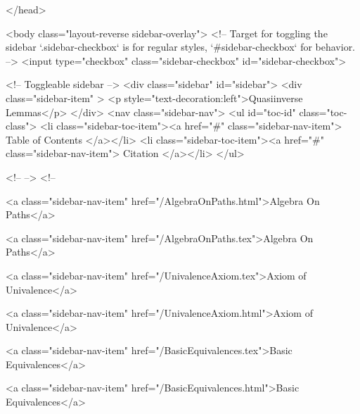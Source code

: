 </head>


  <body class="layout-reverse sidebar-overlay">
    <!-- Target for toggling the sidebar `.sidebar-checkbox` is for regular
     styles, `#sidebar-checkbox` for behavior. -->
<input type="checkbox" class="sidebar-checkbox" id="sidebar-checkbox">

<!-- Toggleable sidebar -->
<div class="sidebar" id="sidebar">
  <div class="sidebar-item" >
    <p style="text-decoration:left">Quasiinverse Lemmas</p>
  </div>
  <nav class="sidebar-nav">
    <ul id="toc-id" class="toc-class">
  <li class="sidebar-toc-item"><a href="#" class="sidebar-nav-item"> Table of Contents </a></li>
  <li class="sidebar-toc-item"><a href="#" class="sidebar-nav-item"> Citation </a></li>
</ul>


    <!--  -->
    <!-- 
      
    
      
    
      
    
      
    
      
        
      
    
      
        
          <a class="sidebar-nav-item" href="/AlgebraOnPaths.html">Algebra On Paths</a>
        
      
    
      
        
          <a class="sidebar-nav-item" href="/AlgebraOnPaths.tex">Algebra On Paths</a>
        
      
    
      
        
          <a class="sidebar-nav-item" href="/UnivalenceAxiom.tex">Axiom of Univalence</a>
        
      
    
      
        
          <a class="sidebar-nav-item" href="/UnivalenceAxiom.html">Axiom of Univalence</a>
        
      
    
      
        
          <a class="sidebar-nav-item" href="/BasicEquivalences.tex">Basic Equivalences</a>
        
      
    
      
        
          <a class="sidebar-nav-item" href="/BasicEquivalences.html">Basic Equivalences</a>
        
      
    

